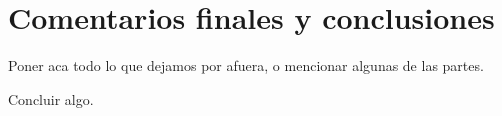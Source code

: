 \newpage
\section{Comentarios finales y conclusiones}

Poner aca todo lo que dejamos por afuera, o mencionar algunas de las partes.

Concluir algo.























